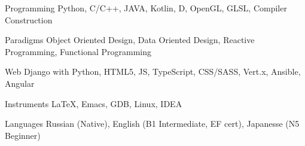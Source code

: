 


\begin{cvskills}


\cvskill
{Programming} %
{Python, C/C++, JAVA, Kotlin, D, OpenGL, GLSL, Compiler Construction} %

\cvskill
{Paradigms} %
{Object Oriented Design, Data Oriented Design, Reactive Programming, Functional Programming}



\cvskill
{Web} %
{Django with Python, HTML5, JS, TypeScript, CSS/SASS, Vert.x, Ansible, Angular} %

\cvskill
{Instruments}
{LaTeX, Emacs, GDB, Linux, IDEA}


\cvskill
{Languages} %
{Russian (Native), English (B1 Intermediate, EF cert), Japanesse (N5 Beginner)} %


\end{cvskills}
